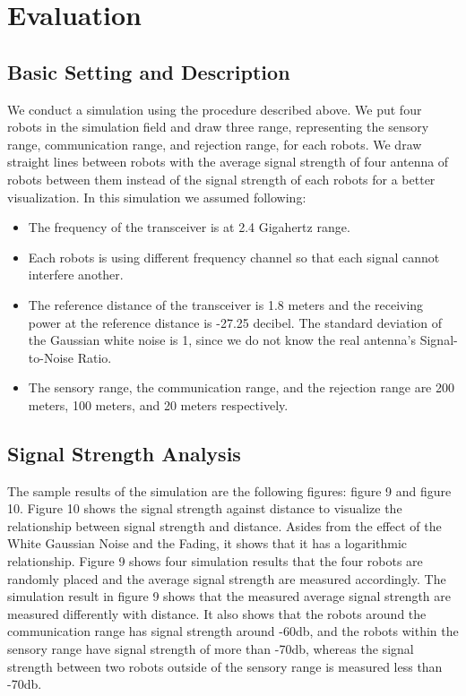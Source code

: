 \section{Evaluation}
\label{sec:evaluation}
\label{Simulation Result}
\subsection{Basic Setting and Description}
\indent 
	We conduct a simulation using the procedure described above. We put four robots in the simulation field and draw three range, representing the sensory range, communication range, and rejection range, for each robots. We draw straight lines between robots with the average signal strength of four antenna of robots between them instead of the signal strength of each robots for a better visualization. In this simulation we assumed following:
\begin{itemize}
	\item The frequency of the transceiver is at 2.4 Gigahertz range.
	\item Each robots is using different frequency channel so that each signal cannot interfere another.
	\item The reference distance of the transceiver is 1.8 meters and the receiving power at the reference distance is -27.25 decibel. The standard deviation of the Gaussian white noise is 1, since we do not know the real antenna's Signal-to-Noise Ratio.
	\item The sensory range, the communication range, and the rejection range are 200 meters, 100 meters, and 20 meters respectively.
\end{itemize}



\subsection{Signal Strength Analysis}
\par
	The sample results of the simulation are the following figures: figure 9 and figure 10. Figure 10 shows the signal strength against distance to visualize the relationship between signal strength and distance. Asides from the effect of the White Gaussian Noise and the Fading, it shows that it has a logarithmic relationship. Figure 9 shows four simulation results that the four robots are randomly placed and the average signal strength are measured accordingly. The simulation result in figure 9 shows that the measured average signal strength are measured differently with distance. It also shows that the robots around the communication range has signal strength around -60db, and the robots within the sensory range have signal strength of more than -70db, whereas the signal strength between two robots outside of the sensory range is measured less than -70db. \\
 
